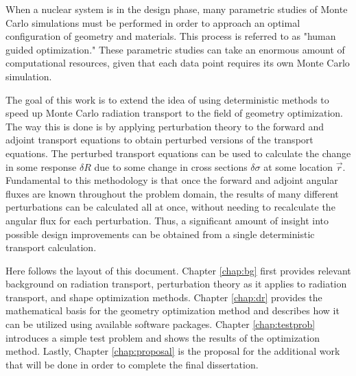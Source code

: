 When a nuclear system is in the design phase, many parametric studies of Monte Carlo simulations must be performed in order to approach an optimal configuration of geometry and materials.
This process is referred to as "human guided optimization."
These parametric studies can take an enormous amount of computational resources, given that each data point requires its own Monte Carlo simulation.

The goal of this work is to extend the idea of using deterministic methods to speed up Monte Carlo radiation transport to the field of geometry optimization.
The way this is done is by applying perturbation theory to the forward and adjoint transport equations to obtain perturbed versions of the transport equations.
The perturbed transport equations can be used to calculate the change in some response $\delta R$ due to some change in cross sections $\delta\sigma$ at some location $\vec{r}$.
Fundamental to this methodology is that once the forward and adjoint angular fluxes are known throughout the problem domain, the results of many different perturbations can be calculated all at once, without needing to recalculate the angular flux for each perturbation.
Thus, a significant amount of insight into possible design improvements can be obtained from a single deterministic transport calculation.

Here follows the layout of this document.
Chapter \ref{chap:bg} first provides relevant background on radiation transport, perturbation theory as it applies to radiation transport, and shape optimization methods.
Chapter \ref{chap:dr} provides the mathematical basis for the geometry optimization method and describes how it can be utilized using available software packages.
Chapter \ref{chap:testprob} introduces a simple test problem and shows the results of the optimization method.
Lastly, Chapter \ref{chap:proposal} is the proposal for the additional work that will be done in order to complete the final dissertation.


